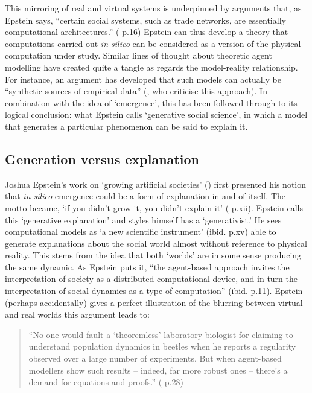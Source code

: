 This mirroring of real and virtual systems is underpinned by arguments that, as Epstein says, ``certain social systems, such as trade networks, are essentially computational architectures.'' (\citealt{epstein_generative_2006} p.16) Epstein can thus develop a theory that computations carried out \emph{in silico} can be considered as a version of the physical computation under study. Similar lines of thought about theoretic agent modelling have created quite a tangle as regards the model-reality relationship. For instance, an argument has developed that such models can actually be ``synthetic sources of empirical data'' (\citealt{di_paolo_simulation_2000}, who criticise this approach). In combination with the idea of `emergence', this has been followed through to its logical conclusion: what Epstein calls `generative social science', in which a model that generates a particular phenomenon can be said to explain it. 

\subsection{Generation versus explanation \label{sec:generative}}

Joshua Epstein's work on `growing artificial societies' (\citealt{epstein_growing_1996}) first presented his notion that \emph{in silico} emergence could be a form of explanation in and of itself. The motto became, `if you didn't grow it, you didn't explain it' (\citealt{epstein_generative_2006} p.xii). Epstein calls this `generative explanation' and styles himself has a `generativist.' He sees computational models as `a new scientific instrument' (ibid. p.xv) able to generate explanations about the social world almost without reference to physical reality. This stems from the idea that both `worlds' are in some sense producing the same dynamic. As Epstein puts it, ``the agent-based approach invites the interpretation of society as a distributed computational device, and in turn the interpretation of social dynamics as a type of computation'' (ibid. p.11). Epstein (perhaps accidentally) gives a perfect illustration of the blurring between virtual and real worlds this argument leads to: 

\begin{quote}
``No-one would fault a `theoremless' laboratory biologist for claiming to understand population dynamics in beetles when he reports a regularity observed over a large number of experiments. But when agent-based modellers show such results – indeed, far more robust ones – there's a demand for equations and proofs.'' (\citealt{epstein_generative_2006} p.28)
\end{quote}

